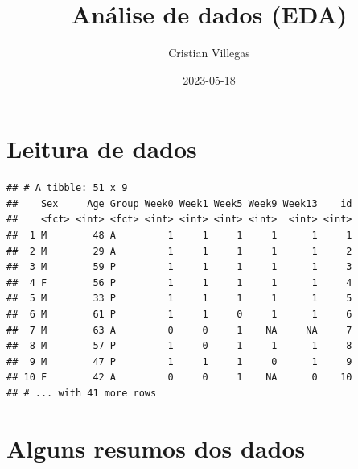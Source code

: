 \documentclass[
]{article}
\title{Análise de dados (EDA)}
\author{Cristian Villegas}
\date{2023-05-18}
\newenvironment{Shaded}{\begin{snugshade}}{\end{snugshade}}
\newcommand{\AttributeTok}[1]{\textcolor[rgb]{0.77,0.63,0.00}{#1}}
\newcommand{\ConstantTok}[1]{\textcolor[rgb]{0.00,0.00,0.00}{#1}}
\newcommand{\DecValTok}[1]{\textcolor[rgb]{0.00,0.00,0.81}{#1}}
\newcommand{\FunctionTok}[1]{\textcolor[rgb]{0.00,0.00,0.00}{#1}}
\newcommand{\NormalTok}[1]{#1}
\newcommand{\OtherTok}[1]{\textcolor[rgb]{0.56,0.35,0.01}{#1}}
\newcommand{\SpecialCharTok}[1]{\textcolor[rgb]{0.00,0.00,0.00}{#1}}
\newcommand{\StringTok}[1]{\textcolor[rgb]{0.31,0.60,0.02}{#1}}
\begin{document}
\maketitle

{
\setcounter{tocdepth}{2}
\tableofcontents
}
\hypertarget{leitura-de-dados}{%
\section{Leitura de dados}\label{leitura-de-dados}}

\begin{Shaded}
\end{Shaded}

\begin{verbatim}
## # A tibble: 51 x 9
##    Sex     Age Group Week0 Week1 Week5 Week9 Week13    id
##    <fct> <int> <fct> <int> <int> <int> <int>  <int> <int>
##  1 M        48 A         1     1     1     1      1     1
##  2 M        29 A         1     1     1     1      1     2
##  3 M        59 P         1     1     1     1      1     3
##  4 F        56 P         1     1     1     1      1     4
##  5 M        33 P         1     1     1     1      1     5
##  6 M        61 P         1     1     0     1      1     6
##  7 M        63 A         0     0     1    NA     NA     7
##  8 M        57 P         1     0     1     1      1     8
##  9 M        47 P         1     1     1     0      1     9
## 10 F        42 A         0     0     1    NA      0    10
## # ... with 41 more rows
\end{verbatim}

\hypertarget{alguns-resumos-dos-dados}{%
\section{Alguns resumos dos dados}\label{alguns-resumos-dos-dados}}
\end{document}
